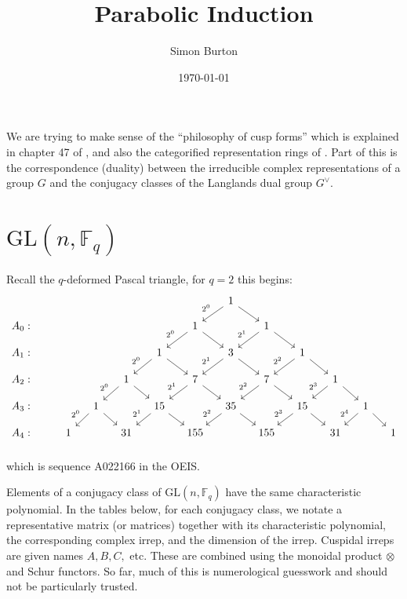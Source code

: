 \documentclass[11pt,oneside]{article}
\title{Parabolic Induction}
\author{Simon Burton}
\date{\today}
\newcommand{\GL}{\mathrm{GL}}
\newcommand{\Field}{\mathbb{F}}
\newcommand{\tensor}{\otimes}
\begin{document}
\maketitle

We are trying to make sense of the ``philosophy of cusp forms''
which is explained in chapter 47 of \cite{Bump2004},
and also the categorified representation rings of \cite{Joyal1995}.
Part of this is the correspondence (duality)
between the irreducible complex
representations of a group $G$ and the 
conjugacy classes of the Langlands dual group $G^{\vee}$.

\section{$\GL(n,\Field_q)$}

Recall the $q$-deformed Pascal triangle, for $q=2$ this begins:
$$
\begin{tikzcd}[column sep=small, row sep=small]
 &  &  &  &  &  &  & 1\arrow[dl, swap, "2^0"]\arrow[dr] &  &  &  &  &  \\
A_0: &  &  &  &  &  & 1\arrow[dl, swap, "2^{0}"]\arrow[dr] &  & 1\arrow[dl, swap, "2^{1}"]\arrow[dr] &  &  &  &  \\
A_1: &  &  &  &  & 1\arrow[dl, swap, "2^{0}"]\arrow[dr] &  & 3\arrow[dl, swap, "2^{1}"]\arrow[dr] &  & 1\arrow[dl, swap, "2^{2}"]\arrow[dr] &  &  &  \\
A_2: &  &  &  & 1\arrow[dl, swap, "2^{0}"]\arrow[dr] &  & 7\arrow[dl, swap, "2^{1}"]\arrow[dr] &  & 7\arrow[dl, swap, "2^{2}"]\arrow[dr] &  & 1\arrow[dl, swap, "2^{3}"]\arrow[dr] &  &  \\
A_3: &  &  & 1\arrow[dl, swap, "2^{0}"]\arrow[dr] &  & 15\arrow[dl, swap, "2^{1}"]\arrow[dr] &  & 35\arrow[dl, swap, "2^{2}"]\arrow[dr] &  & 15\arrow[dl, swap, "2^{3}"]\arrow[dr] &  & 1\arrow[dl, swap, "2^{4}"]\arrow[dr] &  \\
A_4: &  & 1 &  & 31 &  & 155 &  & 155 &  & 31 &  & 1 \\
\end{tikzcd}
$$
which is sequence A022166 in the OEIS.

Elements of a 
conjugacy class of $\GL(n,\Field_q)$ have the same characteristic polynomial.
In the tables below, for each conjugacy class,
we notate a representative matrix (or matrices) together with its
characteristic polynomial, the corresponding complex irrep,
and the dimension of the irrep.
Cuspidal irreps are given names $A, B, C,$ etc.
These are combined using the monoidal product
$\tensor$ and Schur functors.
So far, much of this is numerological guesswork and should not be particularly trusted.
\end{document}
